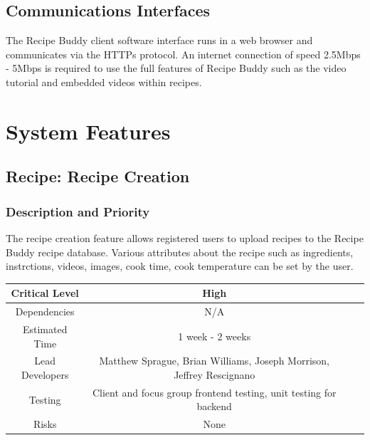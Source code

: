 \documentclass{scrreprt}
\begin{document}
\section{Communications Interfaces}
The Recipe Buddy client software interface runs in a web browser and communicates via the HTTPs protocol. An internet connection of speed 2.5Mbps - 5Mbps is required to use the full features of Recipe Buddy such as the video tutorial and embedded videos within recipes.

\chapter{System Features}

\section{Recipe: Recipe Creation}

\subsection{Description and Priority}

The recipe creation feature allows registered users to upload recipes to the Recipe Buddy recipe database. Various attributes about the recipe such as ingredients, instrctions, videos, images, cook time, cook temperature can be set by the user.

\begin{center}
    \begin{tabular}{| c | c | c | c |}
        \hline
        Critical Level  & High                                                                 \\
        \hline
        Dependencies    & N/A                                                                  \\
        \hline
        Estimated Time  & 1 week - 2 weeks                                                     \\
        \hline
        Lead Developers & Matthew Sprague, Brian Williams, Joseph Morrison, Jeffrey Rescignano \\
        \hline
        Testing         & Client and focus group frontend testing, unit testing for backend    \\
        \hline
        Risks           & None                                                                 \\
        \hline
    \end{tabular}
\end{center}
\end{document}
